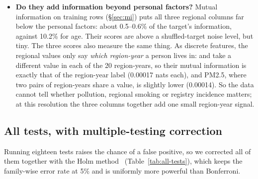 \begin{itemize}
  \item \textbf{Do they add information beyond personal factors?} Mutual information on training rows (\S\ref{sec:mi}) puts all three regional columns far below the personal factors: about 0.5--0.6\% of the target's information, against 10.2\% for age. Their scores are above a shuffled-target noise level, but tiny. The three scores also measure the same thing. As discrete features, the regional values only say \emph{which region-year} a person lives in:  and  take a different value in each of the 20 region-years, so their mutual information is exactly that of the region-year label (0.00017 nats each), and PM2.5, where two pairs of region-years share a value, is slightly lower (0.00014). So the data cannot tell whether pollution, regional smoking or registry incidence matters; at this resolution the three columns together add one small region-year signal.
\end{itemize}

\begin{table}[htbp]
\centering\small
\caption{Spearman correlation of each regional measure with the weighted NHIS lung-cancer rate: over all 20 region-years, between the 4 regional means, and within regions (year-to-year deviations from each region's mean). Between-region values use $n = 4$, so $\rho$ can only take a few values; the 0.00 for PM2.5 and smoking rate is exact (see text). Source: \texttt{regional\_within\_between.csv}.}\label{tab:regional}

\end{table}

\subsection{All tests, with multiple-testing correction}\label{sec:alltests}

Running eighteen tests raises the chance of a false positive, so we corrected all of them together with the Holm method~\cite{holm} (Table~\ref{tab:all-tests}), which keeps the family-wise error rate at 5\% and is uniformly more powerful than Bonferroni.

\begin{table}[htbp]
\centering\small
\caption{All \nTests hypothesis tests with raw and Holm-adjusted $p$-values, labelled with the research question each one answers (\texttt{results/tables/all\_tests\_holm.csv}). $^{a}$The 20 region-years are not independent (4 regions $\times$ 5 years), so this $p$-value is optimistic; see \S\ref{sec:regional} and Table~\ref{tab:regional}.}\label{tab:all-tests}

\end{table}

